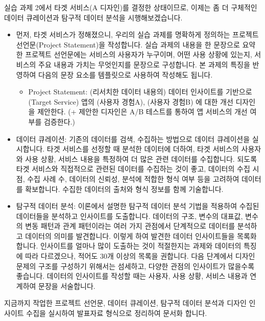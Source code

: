 \documentclass[
  letterpaper,
]{book}
\providecommand{\tightlist}{%
  \setlength{\itemsep}{0pt}\setlength{\parskip}{0pt}}\usepackage{longtable,booktabs,array}
\begin{document}
실습 과제 2에서 타겟 서비스(A 디자인)를 결정한 상태이므로, 이제는 좀 더
구체적인 데이터 큐레이션과 탐구적 데이터 분석을 시행해보겠습니다.

\begin{itemize}
\tightlist
\item
  먼저, 타겟 서비스가 정해졌으니, 우리의 실습 과제를 명확하게 정의하는
  프로젝트 선언문(Project Statement)을 작성합니다. 실습 과제의 내용을 한
  문장으로 요약한 프로젝트 선언문에는 서비스의 사용자가 누구이며, 어떤
  사용 상황에 있는지, 서비스의 주요 내용과 가치는 무엇인지를 문장으로
  구성합니다. 본 과제의 특징을 반영하여 다음의 문장 요소를 템플릿으로
  사용하여 작성해도 됩니다.

  \begin{itemize}
  \tightlist
  \item
    Project Statement: (리서치한 데이터 내용의) 데이터 인사이트를
    기반으로 (Target Service) 앱의 (사용자 경험A), (사용자 경험B) 에
    대한 개선 디자인을 제안한다. (+ 제안한 디자인은 A/B 테스트를 통하여
    앱 서비스의 개선 여부를 검증한다.)
  \end{itemize}
\item
  데이터 큐레이션: 기존의 데이터를 검색, 수집하는 방법으로 데이터
  큐레이션을 실시합니다. 타겟 서비스를 선정할 때 분석한 데이터에 더하여,
  타겟 서비스의 사용자와 사용 상황, 서비스 내용을 특정하여 더 많은 관련
  데이터를 수집합니다. 되도록 타겟 서비스와 직접적으로 관련된 데이터를
  수집하는 것이 좋고, 데이터의 수집 시점, 수집 사례 수, 데이터의 신뢰성,
  분석에 적합한 형식 여부 등을 고려하여 데이터를 확보합니다. 수집한
  데이터의 출처와 형식 정보를 함께 기술합니다.
\item
  탐구적 데이터 분석: 이론에서 설명한 탐구적 데이터 분석 기법을 적용하여
  수집된 데이터들을 분석하고 인사이트를 도출합니다. 데이터의 구조,
  변수의 대표값, 변수의 변동 패턴과 관계 패턴이라는 여러 가지 관점에서
  단계적으로 데이터를 분석하고 데이터의 의미를 발견합니다. 이렇게 하여
  발견한 데이터 인사이트들을 목록화 합니다. 인사이트를 얼마나 많이
  도출하는 것이 적절한지는 과제와 데이터의 특징에 따라 다르겠으나,
  적어도 30개 이상의 목록을 권합니다. 다음 단계에서 디자인 문제의 구조를
  구성하기 위해서는 섬세하고, 다양한 관점의 인사이트가 많을수록
  좋습니다. 데이터의 인사이트를 작성할 때는 사용자, 사용 상황, 서비스
  내용과 연계하여 문장을 서술합니다.
\end{itemize}

지금까지 작업한 프로젝트 선언문, 데이터 큐레이션, 탐구적 데이터 분석과
디자인 인사이트 수집을 실시하여 발표자료 형식으로 정리하여 문서화
합니다.
\end{document}
